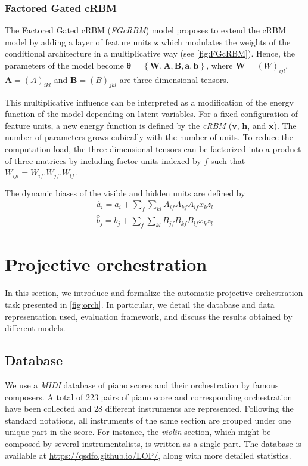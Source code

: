 \documentclass{article}
\begin{document}
\subsubsection{Factored Gated cRBM}
The Factored Gated cRBM (\textit{FGcRBM}) model  \cite{taylor2009factored} proposes to extend the cRBM model by adding a layer of feature units $\bm{z}$ which modulates the weights of the conditional architecture in a multiplicative way (see \ref{fig:FGcRBM}). Hence, the parameters of the model become $\bm{\theta} = \left\lbrace \bm{W} , \bm{A} , \bm{B} , \bm{a} , \bm{b} \right\rbrace$, where $\bm{W} = (W)_{ijl}$, $\bm{A}=(A)_{ikl}$ and $\bm{B}=(B)_{jkl}$ are three-dimensional tensors.

This multiplicative influence can be interpreted as a modification of the energy function of the model depending on latent variables. For a fixed configuration of feature units, a new energy function is defined by the \textit{cRBM} ($\bm{v}$, $\bm{h}$, and $\bm{x}$). The number of parameters grows cubically with the number of units. To reduce the computation load, the three dimensional tensors can be factorized into a product of three matrices by including factor units indexed by $f$ such that $W_{ijl} = W_{if} . W_{jf} . W_{lf}$.

The dynamic biases of the visible and hidden units are defined by
\begin{align}
\hat{a}_{i} = a_{i} + \sum_{f} \sum_{kl}A_{if}A_{kf}A_{lf}x_{k}z_{l}\\
\hat{b}_{j} = b_{j} + \sum_{f} \sum_{kl}B_{jf}B_{kf}B_{lf}x_{k}z_{l}
\end{align}

\section{Projective orchestration}
In this section, we introduce and formalize the automatic projective orchestration task presented in \ref{fig:orch}. In particular, we detail the database and data representation used, evaluation framework, and discuss the results obtained by different models.

\subsection{Database}
We use a \textit{MIDI} database of piano scores and their orchestration by famous composers. A total of 223 pairs of piano score and corresponding orchestration have been collected and 28 different instruments are represented.
Following the standard notations, all instruments of the same section are grouped under one unique part in the score. For instance, the \textit{violin} section, which might be composed by several instrumentalists, is written as a single part.
The database is available at \url{https://qsdfo.github.io/LOP/}, along with more detailed statistics.
\end{document}
